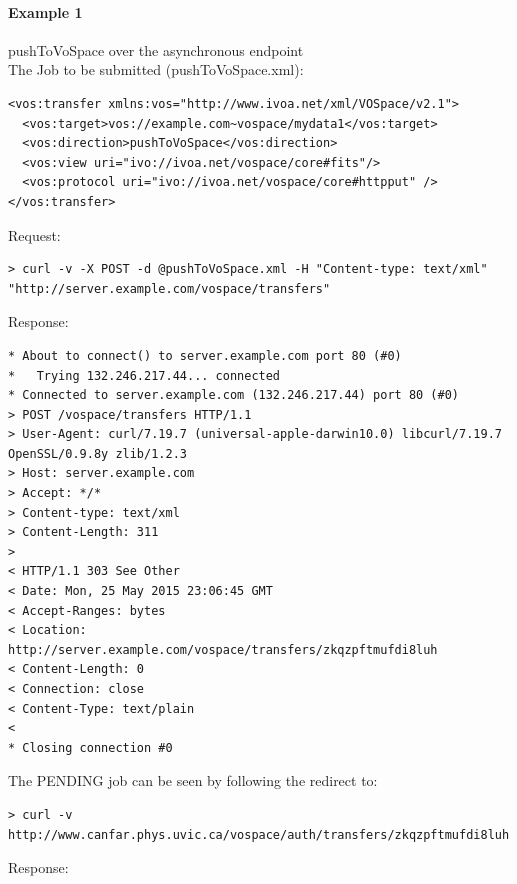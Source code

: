 \documentclass[11pt,a4paper]{ivoa}
\begin{document}
\paragraph{Example 1}
pushToVoSpace over the asynchronous endpoint
\\[5px]
\noindent
The Job to be submitted (pushToVoSpace.xml):
\begin{lstlisting}
<vos:transfer xmlns:vos="http://www.ivoa.net/xml/VOSpace/v2.1">
  <vos:target>vos://example.com~vospace/mydata1</vos:target>
  <vos:direction>pushToVoSpace</vos:direction>
  <vos:view uri="ivo://ivoa.net/vospace/core#fits"/>
  <vos:protocol uri="ivo://ivoa.net/vospace/core#httpput" />
</vos:transfer>
\end{lstlisting}
Request:
\begin{lstlisting}
> curl -v -X POST -d @pushToVoSpace.xml -H "Content-type: text/xml" "http://server.example.com/vospace/transfers"
\end{lstlisting}
Response:
\begin{lstlisting}
* About to connect() to server.example.com port 80 (#0)
*   Trying 132.246.217.44... connected
* Connected to server.example.com (132.246.217.44) port 80 (#0)
> POST /vospace/transfers HTTP/1.1
> User-Agent: curl/7.19.7 (universal-apple-darwin10.0) libcurl/7.19.7 OpenSSL/0.9.8y zlib/1.2.3
> Host: server.example.com
> Accept: */*
> Content-type: text/xml
> Content-Length: 311
>
< HTTP/1.1 303 See Other
< Date: Mon, 25 May 2015 23:06:45 GMT
< Accept-Ranges: bytes
< Location: http://server.example.com/vospace/transfers/zkqzpftmufdi8luh
< Content-Length: 0
< Connection: close
< Content-Type: text/plain
<
* Closing connection #0
\end{lstlisting}
The PENDING job can be seen by following the redirect to:
\begin{lstlisting}
> curl -v http://www.canfar.phys.uvic.ca/vospace/auth/transfers/zkqzpftmufdi8luh
\end{lstlisting}
Response:
\end{document}
